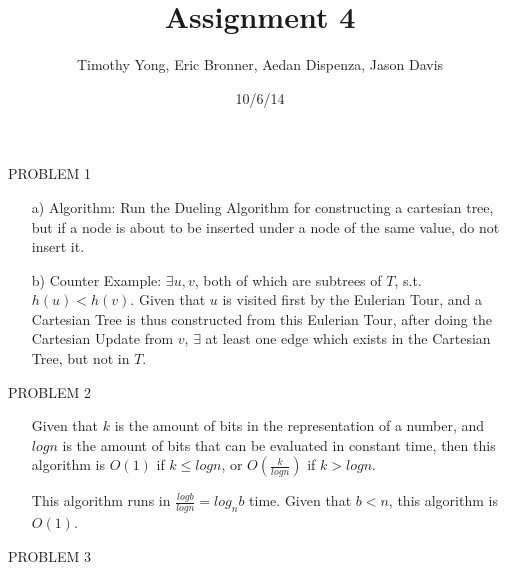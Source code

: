 \documentclass[a4paper]{article}
\title{Assignment 4}
\author{Timothy Yong, Eric Bronner, Aedan Dispenza, Jason Davis}
\date{10/6/14}
\begin{document}
\maketitle

\bigskip

\noindent PROBLEM 1

\begin{enumerate}

\item[a)] Algorithm: Run the Dueling Algorithm for constructing a cartesian tree, but if a node is about to be inserted under a node of the same value, do not insert it.

\item[b)] Counter Example: $\exists u,v$, both of which are subtrees of $T$, s.t. $h(u) < h(v)$. Given that $u$ is visited first by the Eulerian Tour, and a Cartesian Tree is thus constructed from this Eulerian Tour, after doing the Cartesian Update from $v$, $\exists$ at least one edge which exists in the Cartesian Tree, but not in $T$. 

\end{enumerate}

\bigskip
\bigskip

\noindent PROBLEM 2

\begin{enumerate}

\item[] Given that $k$ is the amount of bits in the representation of a number, and $log{n}$ is the amount of bits that can be evaluated in constant time, then this algorithm is $O(1)$ if $k \leq log{n}$, or $O(\frac{k}{log{n}})$ if $k > log{n}$.

\item[] This algorithm runs in $\frac{log{b}}{log{n}} = log_n{b}$ time. Given that $b < n$, this algorithm is $O(1)$. 

\end{enumerate}

\bigskip
\bigskip

\noindent PROBLEM 3
\end{document}
